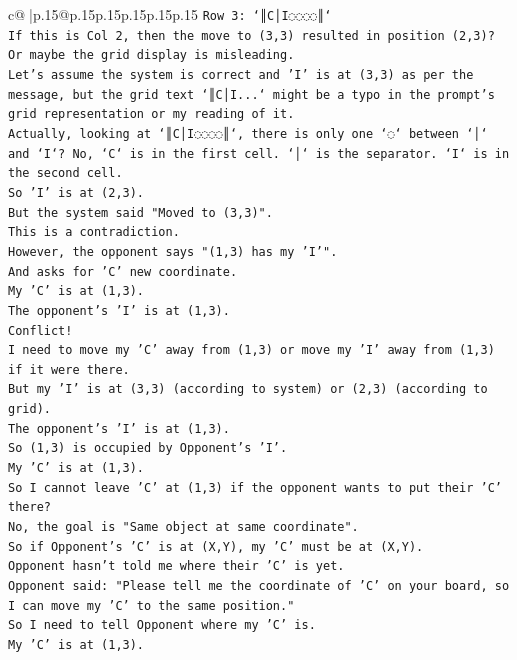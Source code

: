 \documentclass{article}
\begin{document}
{\begin{supertabular}{c@{$\;$}|p{.15\linewidth}@{}p{.15\linewidth}p{.15\linewidth}p{.15\linewidth}p{.15\linewidth}p{.15\linewidth}}
{{{\texttt{Row 3: `║C│I◌◌◌◌║`} \\
\texttt{If this is Col 2, then the move to (3,3) resulted in position (2,3)?} \\
\texttt{Or maybe the grid display is misleading.} \\
\texttt{Let's assume the system is correct and 'I' is at (3,3) as per the message, but the grid text `║C│I...` might be a typo in the prompt's grid representation or my reading of it.} \\
\texttt{Actually, looking at `║C│I◌◌◌◌║`, there is only one `◌` between `│` and `I`? No, `C` is in the first cell. `│` is the separator. `I` is in the second cell.} \\
\texttt{So 'I' is at (2,3).} \\
\texttt{But the system said "Moved to (3,3)".} \\
\texttt{This is a contradiction.} \\
\texttt{However, the opponent says "(1,3) has my 'I'".} \\
\texttt{And asks for 'C' new coordinate.} \\
\texttt{My 'C' is at (1,3).} \\
\texttt{The opponent's 'I' is at (1,3).} \\
\texttt{Conflict!} \\
\texttt{I need to move my 'C' away from (1,3) or move my 'I' away from (1,3) if it were there.} \\
\texttt{But my 'I' is at (3,3) (according to system) or (2,3) (according to grid).} \\
\texttt{The opponent's 'I' is at (1,3).} \\
\texttt{So (1,3) is occupied by Opponent's 'I'.} \\
\texttt{My 'C' is at (1,3).} \\
\texttt{So I cannot leave 'C' at (1,3) if the opponent wants to put their 'C' there?} \\
\texttt{No, the goal is "Same object at same coordinate".} \\
\texttt{So if Opponent's 'C' is at (X,Y), my 'C' must be at (X,Y).} \\
\texttt{Opponent hasn't told me where their 'C' is yet.} \\
\texttt{Opponent said: "Please tell me the coordinate of 'C' on your board, so I can move my 'C' to the same position."} \\
\texttt{So I need to tell Opponent where my 'C' is.} \\
\texttt{My 'C' is at (1,3).} \\
}}}
\end{supertabular}}
\end{document}
